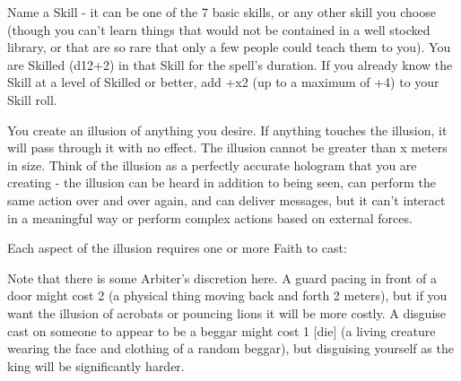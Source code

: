 \newpage

\MYSTERY [
  Name = Expertise,
  Link = arcana-mystery-expertise,
  Paradigm = Mind,
  Save = N,
  Duration = \SUM Minutes,
  Target = Self
]

Name a Skill - it can be one of the 7 basic skills, or any other skill you choose (though you can't learn things that would not be contained in a well stocked library, or that are so rare that only a few people could teach them to you).  You are Skilled (d12+2) in that Skill for the spell's duration.  If you already know the Skill at a level of Skilled or better, add +\DICE x2 (up to a maximum of +4) to your Skill roll.

\MYSTERY [
  Name = Illusion,
  Link = arcana-mystery-illusion,
  Paradigm = Mind,
  Save = N,
  Duration = Varies,
  Target = See Below
]

You create an illusion of anything you desire. If anything touches the illusion, it will pass through it with no effect.  The illusion cannot be greater than \DICE x \DICE meters in size.  Think of the illusion as a perfectly accurate hologram that you are creating - the illusion can be heard in addition to being seen, can perform the same action over and over again, and can deliver messages, but it can't interact in a meaningful way or perform complex actions based on external forces. 

Each aspect of the illusion requires one or more Faith to cast:


Note that there is some Arbiter's discretion here.  A guard pacing in front of a door might cost 2 \DICE (a physical thing moving back and forth 2
meters), but if you want the illusion of acrobats or pouncing lions it will be more costly.  A disguise cast on someone to appear to be a beggar might
cost 1 [die] (a living creature wearing the face and clothing of a random beggar), but disguising yourself as the king will be significantly harder.

